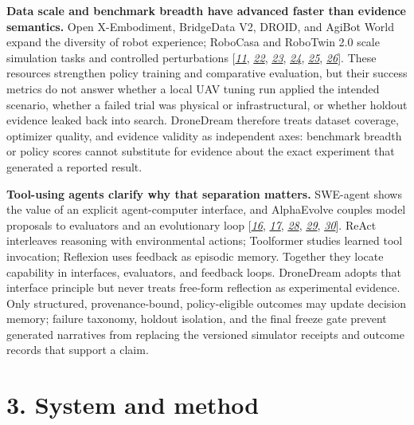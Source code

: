 \textbf{Data scale and benchmark breadth have advanced faster than
evidence semantics.} Open X-Embodiment, BridgeData V2, DROID, and AgiBot
World expand the diversity of robot experience; RoboCasa and RoboTwin
2.0 scale simulation tasks and controlled perturbations
{[}\protect\hyperlink{ref_11}{\emph{11}},
\protect\hyperlink{ref_22}{\emph{22}},
\protect\hyperlink{ref_23}{\emph{23}},
\protect\hyperlink{ref_24}{\emph{24}},
\protect\hyperlink{ref_25}{\emph{25}},
\protect\hyperlink{ref_26}{\emph{26}}{]}. These resources strengthen
policy training and comparative evaluation, but their success metrics do
not answer whether a local UAV tuning run applied the intended scenario,
whether a failed trial was physical or infrastructural, or whether
holdout evidence leaked back into search. DroneDream therefore treats
dataset coverage, optimizer quality, and evidence validity as independent
axes: benchmark breadth or policy scores cannot substitute for evidence
about the exact experiment that generated a reported result.

\textbf{Tool-using agents clarify why that separation matters.}
SWE-agent shows the value of an explicit agent-computer interface, and
AlphaEvolve couples model proposals to evaluators and an evolutionary
loop {[}\protect\hyperlink{ref_16}{\emph{16}},
\protect\hyperlink{ref_17}{\emph{17}},
\protect\hyperlink{ref_28}{\emph{28}},
\protect\hyperlink{ref_29}{\emph{29}},
\protect\hyperlink{ref_30}{\emph{30}}{]}. ReAct interleaves reasoning
with environmental actions; Toolformer studies learned tool invocation;
Reflexion uses feedback as episodic memory. Together they locate
capability in interfaces, evaluators, and feedback loops. DroneDream
adopts that interface principle but never treats free-form reflection as
experimental evidence. Only structured, provenance-bound,
policy-eligible outcomes may update decision memory; failure taxonomy,
holdout isolation, and the final freeze gate prevent generated narratives
from replacing the versioned simulator receipts and outcome records that support a claim.

\section{\texorpdfstring{\textbf{3. System and
method}}{3. System and method}}\label{system-and-method}

